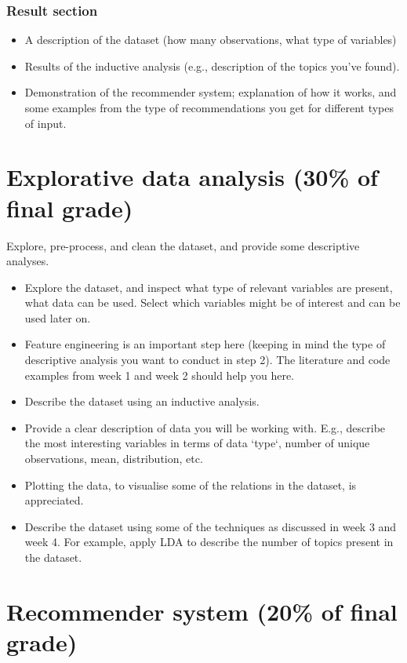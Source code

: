 \subsubsection{Result section}
\begin{itemize}
\item A description of the dataset (how many observations, what type of variables)
\item Results of the inductive analysis (e.g., description of the topics you've found).
\item Demonstration of the recommender system; explanation of how it works, and some examples from the type of recommendations you get for different types of input.
\end{itemize}
	
\section{Explorative data analysis (30\% of final grade)}

Explore, pre-process, and clean the dataset, and provide some descriptive analyses.

\begin{itemize}
\item  Explore the dataset, and inspect what type of relevant variables are present, what data can be used. Select which variables might be of interest and can be used later on.
\item Feature engineering is an important step here (keeping in mind the type of descriptive analysis you want to conduct in step 2). The literature and code examples from week 1 and week 2 should help you here.
\item Describe the dataset using an inductive analysis.
\item Provide a clear description of data you will be working with. E.g., describe the most interesting variables in terms of data `type`, number of unique observations, mean, distribution, etc.
\item  Plotting the data, to visualise some of the relations in the dataset, is appreciated.
\item  Describe the dataset using some of the techniques as discussed in week 3 and week 4. For example, apply LDA to describe the number of topics present in the dataset.
\end{itemize}

\section{Recommender system (20\% of final grade)}

